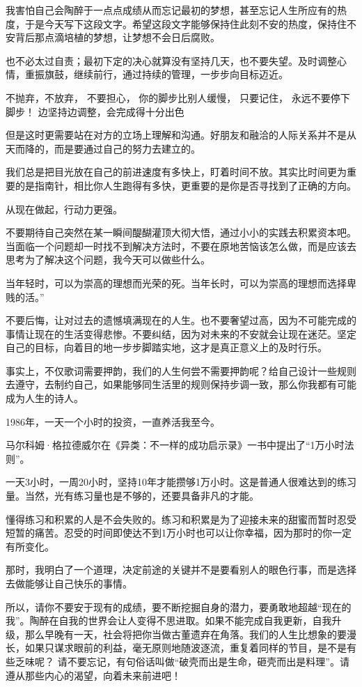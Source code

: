 \documentclass[UTF8,a4paper,8pt]{ctexbook}
\begin{document}
		
		我害怕自己会陶醉于一点点成绩从而忘记最初的梦想，甚至忘记人生所应有的热度，于是今天写下这段文字。希望这段文字能够保持住此刻不安的热度，保持住不安背后那点滴培植的梦想，让梦想不会日后腐败。
		
		
		也不必太过自责；最初下定的决心就算没有坚持几天，也不要失望。及时调整心情，重振旗鼓，继续前行，通过持续的管理，一步步向目标迈近。
		
		
		不抛弃，不放弃， 不要担心， 你的脚步比别人缓慢， 只要记住， 永远不要停下脚步！ 边坚持边调整，会完成得十分出色
		
		
		但是这时更需要站在对方的立场上理解和沟通。好朋友和融洽的人际关系并不是从天而降的，而是要通过自己的努力去建立的。
		
		
		我们总是把目光放在自己的前进速度有多快上，盯着时间不放。其实比时间更为重要的是指南针，相比你人生跑得有多快，更重要的是你是否寻找到了正确的方向。
		
		
		从现在做起，行动力更强。
		
		
		不要期待自己突然在某一瞬间醍醐灌顶大彻大悟，通过小小的实践去积累资本吧。当面临一个问题却一时找不到解决方法时，不要在原地苦恼该怎么做，而是应该去思考为了解决这个问题，我今天可以做些什么。
		
		
		当年轻时，可以为崇高的理想而光荣的死。当年长时，可以为崇高的理想而选择卑贱的活。”
	
		
		不要后悔，让对过去的遗憾填满现在的人生。也不要奢望过高，因为不可能完成的事情让现在的生活变得悲惨。不要纠结，因为对未来的不安就会让现在迷茫。坚定自己的目标，向着目的地一步步脚踏实地，这才是真正意义上的及时行乐。
		
		
		事实上，不仅歌词需要押韵，我们的人生何尝不需要押韵呢？给自己设计一些规则去遵守，去制约自己，如果能够同生活里的规则保持步调一致，那么你我都有可能成为人生的诗人。
		
		
		1986年，一天一个小时的投资，一直养活我至今。
		
		
		马尔科姆·格拉德威尔在《异类：不一样的成功启示录》一书中提出了“1万小时法则”。
		
		
		一天3小时，一周20小时，坚持10年才能攒够1万小时。这是普通人很难达到的练习量。当然，光有练习量也是不够的，还要具备非凡的才能。
		
		
		懂得练习和积累的人是不会失败的。练习和积累是为了迎接未来的甜蜜而暂时忍受短暂的痛苦。忍受的时间即使达不到1万小时也可以让你幸福，因为那时的你一定有所变化。
		
		
		那时，我明白了一个道理，决定前途的关键并不是要看别人的眼色行事，而是选择去做能够让自己快乐的事情。
		
		
		所以，请你不要安于现有的成绩，要不断挖掘自身的潜力，要勇敢地超越“现在的我”。陶醉在自我的世界会让人变得不思进取。如果不能完成自我更新，自我升级，那么早晚有一天，社会将把你当做古董遗弃在角落。我们的人生比想象的要漫长，如果只谋求眼前的利益，毫无原则地随波逐流，重复着同样的节目，是不是有些乏味呢？ 请不要忘记，有句俗话叫做“破壳而出是生命，砸壳而出是料理”。请遵从那些内心的渴望，向着未来前进吧！
		
\end{document}
